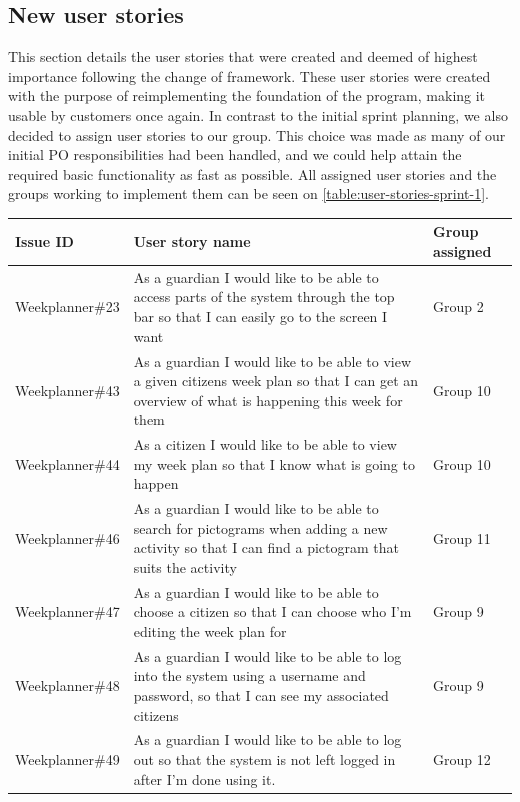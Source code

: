 \subsection{New user stories}
This section details the user stories that were created and deemed of highest importance following the change of framework.
These user stories were created with the purpose of reimplementing the foundation of the program, making it usable by customers once again.
In contrast to the initial sprint planning, we also decided to assign user stories to our group.
This choice was made as many of our initial PO responsibilities had been handled, and we could help attain the required basic functionality as fast as possible.
All assigned user stories and the groups working to implement them can be seen on \autoref{table:user-stories-sprint-1}.
\begin{table}[H]
    \begin{tabular}{|p{2.8cm}|p{8cm}|p{1.6cm}|}
    \hline
    Issue ID        & User story name                                                                                                                                                          & Group assigned       \\ \hline
    Weekplanner\#23 & As a guardian I would like to be able to access parts of the system through the top bar so that I can easily go to the screen I want & Group 2            \\ \hline
    Weekplanner\#43 & As a guardian I would like to be able to view a given citizens week plan so that I can get an overview of what is happening this week for them & Group 10             \\ \hline
    Weekplanner\#44 & As a citizen I would like to be able to view my week plan so that I know what is going to happen & Group 10               \\ \hline
    Weekplanner\#46 & As a guardian I would like to be able to search for pictograms when adding a new activity so that I can find a pictogram that suits the activity & Group 11              \\ \hline
    Weekplanner\#47 & As a guardian I would like to be able to choose a citizen so that I can choose who I’m editing the week plan for  & Group 9             \\ \hline
    Weekplanner\#48 & As a guardian I would like to be able to log into the system using a username and password, so that I can see my associated citizens & Group 9             \\ \hline
    Weekplanner\#49 & As a guardian I would like to be able to log out so that the system is not left logged in after I’m done using it. & Group 12              \\ \hline

\end{tabular}
\end{table}
